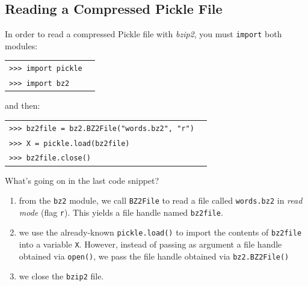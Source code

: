 \documentclass[t,handout,9pt]{beamer}
\begin{document}
\subsection{Reading a Compressed Pickle File}
\begin{frame}
\vfill
In order to read a compressed Pickle file with \textit{bzip2}, you must \texttt{import} both modules:
\begin{table}[]
\begin{flushleft}
\begin{tabular}{ll}
\texttt{>{}>{}> import pickle} &  \\
\texttt{>{}>{}> import bz2} &  \\
\end{tabular}
\end{flushleft}
\end{table}
and then:
\begin{table}[]
\begin{flushleft}
\begin{tabular}{ll}
\texttt{>{}>{}> bz2file = bz2.BZ2File("words.bz2", "r")} &  \\
\texttt{>{}>{}> X = pickle.load(bz2file)} & \\
\texttt{>{}>{}> bz2file.close()} & \\
\end{tabular}
\end{flushleft}
\end{table}
What's going on in the last code snippet?
\begin{enumerate}
	\item from the \texttt{bz2} module, we call \texttt{BZ2File} to read a file called \texttt{words.bz2} in \textit{read mode} (flag \texttt{r}). This yields a file handle named \texttt{bz2file}.
	\item we use the already-known \texttt{pickle.load()} to import the contents of \texttt{bz2file} into a variable \texttt{X}. However, instead of passing as argument a file handle obtained via \texttt{open()}, we pass the file handle obtained via \texttt{bz2.BZ2File()}
	\item we close the \texttt{bzip2} file.
\end{enumerate}
\vfill
\end{frame}
\end{document}
